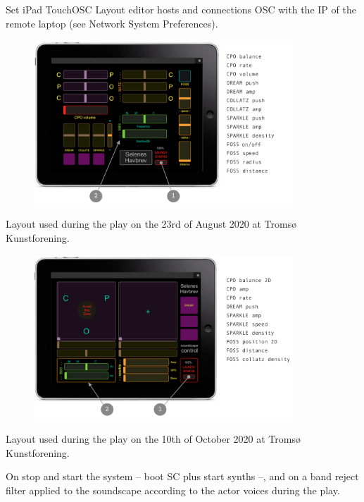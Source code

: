 \begin{description}
\begin{enumerate}
Set iPad TouchOSC \textsf{Layout editor hosts} and \textsf{connections OSC} with the IP of the remote laptop (see \textsf{Network System Preferences}).
\begin{figure}[H]
\hfill \includegraphics[width=0.87\textwidth]{mp/img/ipad1}
\end{figure}
\vspace{-5mm}
Layout used during the play on the 23rd of August 2020 at Troms\o{} Kunstforening.
\begin{figure}[H]
\hfill \includegraphics[width=0.87\textwidth]{mp/img/ipad2}
\end{figure}
\vspace{-5mm}
Layout used during the play on the 10th of October 2020 at Troms\o{} Kunstforening.
\end{enumerate}
\end{description}

On \textcolor{gray}{\large{}} stop and start the system -- boot SC plus start synths --, and on \textcolor{gray}{\large{}} a band reject filter applied to the soundscape according to the actor voices during the play.

